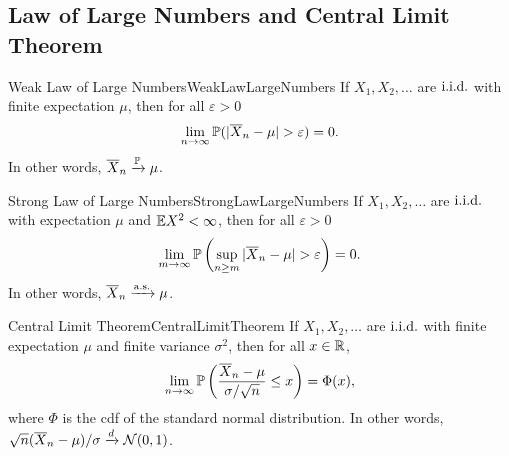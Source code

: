 \subsection{Law of Large Numbers and Central Limit Theorem}

\begin{thm}{Weak Law of Large Numbers}{WeakLawLargeNumbers}
	If \(X_1, X_2, \dots\) are \(\text{i.i.d.}\) with finite expectation \(\mu\), then for all \(\varepsilon > 0\)
	\begin{equation*}
		\lim_{n \to \infty} \mathbb{P}(|\overline{X}_n - \mu| > \varepsilon) = 0.
	\end{equation*}
	In other words, \(\overline{X}_n \xrightarrow{\mathbb{P}} \mu\).
\end{thm}

\begin{thm}{Strong Law of Large Numbers}{StrongLawLargeNumbers}
	If \(X_1, X_2, \dots\) are \(\text{i.i.d.}\) with expectation \(\mu\) and \(\mathbb{E} X^2 < \infty\), then for all \(\varepsilon > 0\)
	\begin{equation*}
		\lim_{m \to \infty} \mathbb{P} \left( \sup_{n \ge m} |\overline{X}_n - \mu| > \varepsilon \right) = 0.
	\end{equation*}
	In other words, \(\overline{X}_n \xrightarrow{\text{a.s.}} \mu\).
\end{thm}

\begin{thm}{Central Limit Theorem}{CentralLimitTheorem}
	If \(X_1, X_2, \dots\) are \(\text{i.i.d.}\) with finite expectation \(\mu\) and finite variance \(\sigma^2\), then for all \(x \in \mathbb{R}\),
	\begin{equation*}
		\lim_{n \to \infty} \mathbb{P} \left( \frac{\overline{X}_n - \mu}{\sigma/\sqrt{n}} \le x \right) = \Phi(x),
	\end{equation*}
	where \(\Phi\) is the cdf of the standard normal distribution. In other words, \(\sqrt{n}(\overline{X}_n - \mu)/\sigma \xrightarrow{d} \mathcal{N}(0, 1)\).
\end{thm}
